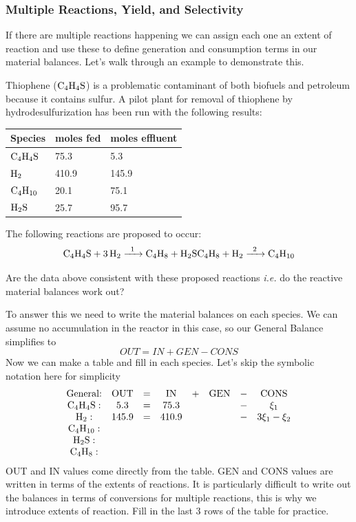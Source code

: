 \documentclass[
]{article}
\begin{document}
\hypertarget{multiple-reactions-yield-and-selectivity}{%
\subsubsection{Multiple Reactions, Yield, and Selectivity}\label{multiple-reactions-yield-and-selectivity}}

If there are multiple reactions happening we can assign each one an extent of reaction and use these to define generation and consumption terms in our material balances. Let's walk through an example to demonstrate this.

Thiophene (\(\ce{C4H4S}\)) is a problematic contaminant of both biofuels and petroleum because it contains sulfur. A pilot plant for removal of thiophene by hydrodesulfurization has been run with the following results:

\begin{longtable}[]{@{}lll@{}}
\toprule
Species & moles fed & moles effluent \\
\midrule
\endhead
\(\ce{C4H4S}\) & 75.3 & 5.3 \\
\(\ce{H2}\) & 410.9 & 145.9 \\
\(\ce{C4H10}\) & 20.1 & 75.1 \\
\(\ce{H2S}\) & 25.7 & 95.7 \\
\bottomrule
\end{longtable}

The following reactions are proposed to occur:
\[\ce{C4H4S + 3H2 ->[1] C4H8 + H2S} \\
\ce{C4H8 + H2 ->[2] C4H10}\]

Are the data above consistent with these proposed reactions \emph{i.e.} do the reactive material balances work out?

To answer this we need to write the material balances on each species. We can assume no accumulation in the reactor in this case, so our General Balance simplifies to
\[OUT = IN + GEN - CONS\]
Now we can make a table and fill in each species. Let's skip the symbolic notation here for simplicity
\[
\begin{array}{cccccccc}
  \text{General:} &\text{OUT}& = & \text{IN} & + & \text{GEN} & - & \text{CONS} \\ 
  \ce{C4H4S}: & 5.3 &=& 75.3 &&&-& \xi_1  \\
  \ce{H2}:& 145.9 &=& 410.9 &&&-& 3\xi_1 - \xi_2 \\
  \ce{C4H10}:& \\
  \ce{H2S}: \\
  \ce{C4H8}:
\end{array}
\]
OUT and IN values come directly from the table. GEN and CONS values are written in terms of the extents of reactions. It is particularly difficult to write out the balances in terms of conversions for multiple reactions, this is why we introduce extents of reaction. Fill in the last 3 rows of the table for practice.
\end{document}
